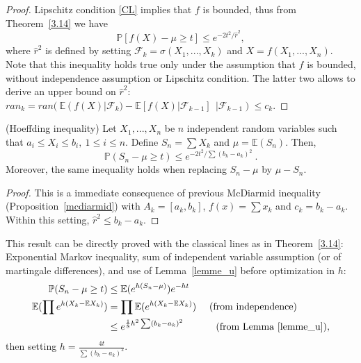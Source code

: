 \begin{proof} Lipschitz condition \eqref{CL} implies that $f$ is bounded, thus from Theorem~\ref{3.14} we have
$$\mathbb{P}\left[f(X)-\mu \geq t\right] \leq e^{-2t^2/\hat r^2},$$ where $\hat r^2$ is defined by setting $\mathcal{F}_k=\sigma(X_1,...,X_k)$ and $X=f(X_1,...,X_n)$.
Note that this inequality holds true only under the assumption that $f$ is bounded, without independence assumption or Lipschitz condition. The latter two allows to derive an upper bound on $\hat r^2$:
$ran_k=ran(~\mathbb{E}(f(X)|\mathcal{F}_k)-\mathbb{E}\left[f(X)|\mathcal{F}_{k-1}\right]~~|\mathcal{F}_{k-1}) \leq c_k$.
\end{proof}


\begin{proposition} ({\sc Hoeffding inequality})
Let $X_1,...,X_n$ be $n$ independent random variables such that $a_i \leq X_i \leq b_i,~1\le i \le n$. Define $S_n=\sum X_k$ and $\mu=\mathbb{E}(S_n)$.
Then, $$\mathbb{P}(S_n-\mu \geq t) \leq e^{-2t^2/\sum(b_k-a_k)^2} ~.$$ Moreover, the same inequality holds when replacing $S_n-\mu$ by $\mu - S_n$.
\end{proposition}

\begin{proof}
 This is a immediate consequence of previous McDiarmid inequality (Proposition~\ref{mcdiarmid}) with $A_k=[a_k,b_k]$, $f(x)=\sum x_k$ and $c_k=b_k-a_k $. Within this setting, $\hat r^2 \leq b_k-a_k$.
\end{proof}

\begin{remark} 
This result can be directly proved with the classical lines as in Theorem~\ref{3.14}: Exponential Markov inequality, sum of independent variable assumption (or of martingale differences), and use of Lemma~\ref{lemme_u} before optimization in $h$:
\begin{align*} 
\mathbb{P}(S_n-\mu \geq t) &\leq \mathbb{E}(e^{h(S_n-\mu)})e^{-ht}\\
\mathbb{E}(\prod e^{h(X_k-\mathbb{E}X_k)})&=\prod \mathbb{E}(e^{h(X_k-\mathbb{E}X_k)})\mbox{~~~~(from independence)}\\
&\leq e^{\frac{1}{8}h^2\sum(b_k-a_k)^2} \mbox{~~~~~~~~~~(from Lemma~\ref{lemme_u})},
\end{align*}
then setting $h=\frac{4t}{\sum(b_k-a_k)^2}$.
\end{remark}

